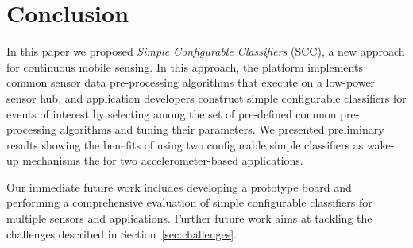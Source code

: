 \section{Conclusion}
\label{sec:conclusion}

In this paper we proposed {\em Simple Configurable Classifiers} (SCC),
a new approach for continuous mobile sensing.  In this approach, the
platform implements common sensor data pre-processing algorithms that
execute on a low-power sensor hub, and application developers
construct simple configurable classifiers for events of interest by
selecting among the set of pre-defined common pre-processing
algorithms and tuning their parameters.  We presented preliminary
results showing the benefits of using two configurable simple
classifiers as wake-up mechanisms the for two accelerometer-based
applications.

Our immediate future work includes developing a prototype board and 
performing a comprehensive evaluation of simple configurable 
classifiers for multiple sensors and applications. Further future work 
aims at tackling the challenges described in Section~\ref{sec:challenges}.  
